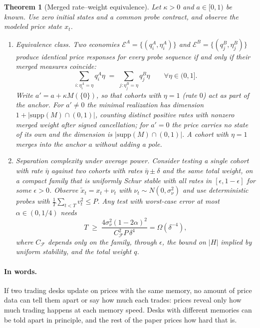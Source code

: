 \documentclass[12pt]{article}
\newtheorem{theorem}{Theorem}[section]
\theoremstyle{definition}
\theoremstyle{remark}
\begin{document}
\begin{theorem}[Merged rate--weight equivalence]\label{thm:merged}
Let $\kappa>0$ and $a\in[0,1)$ be known. Use zero initial states and a common probe contract, and observe the modeled price state $x_t$.
\begin{enumerate}[label=(\roman*)]
\item \emph{Equivalence class.} Two economies $\mathcal E^A=\{(q_i^A,\eta_i^A)\}$ and $\mathcal E^B=\{(q_j^B,\eta_j^B)\}$ produce identical price responses for every probe sequence if and only if their merged measures coincide:
\begin{equation}\label{eq:merged}
\sum_{i:\eta_i^A=\eta} q_i^A\eta \;=\; \sum_{j:\eta_j^B=\eta} q_j^B\eta\qquad\forall\eta\in(0,1].
\end{equation}
Write $a'=a+\kappa M(\{0\})$, so that cohorts with $\eta=1$ (rate $0$) act as part of the anchor. For $a'\neq0$ the minimal realization has dimension $1+|\mathrm{supp}(M)\cap(0,1)|$, counting distinct positive rates with nonzero merged weight after signed cancellation; for $a'=0$ the price carries no state of its own and the dimension is $|\mathrm{supp}(M)\cap(0,1)|$. A cohort with $\eta=1$ merges into the anchor $a$ without adding a pole.
\item \emph{Separation complexity under average power.} Consider testing a single cohort with rate $\bar\eta$ against two cohorts with rates $\bar\eta\pm\delta$ and the same total weight, on a compact family that is uniformly Schur stable with all rates in $[\epsilon,1-\epsilon]$ for some $\epsilon>0$. Observe $\tilde x_t=x_t+\nu_t$ with $\nu_t\sim N(0,\sigma_\nu^2)$ and use deterministic probes with $\frac1T\sum_{t<T}v_t^2\le P$. Any test with worst-case error at most $\alpha\in(0,1/4)$ needs
\begin{equation}\label{eq:Tpower}
T\;\ge\;\frac{4\sigma_\nu^2(1-2\alpha)^2}{C_{\mathcal F}^2P\,\delta^4}=\Omega(\delta^{-4}),
\end{equation}
where $C_{\mathcal F}$ depends only on the family, through $\epsilon$, the bound on $|H|$ implied by uniform stability, and the total weight $q$.
\end{enumerate}
\end{theorem}

\paragraph{In words.} If two trading desks update on prices with the same memory, no amount of price data can tell them apart or say how much each trades: prices reveal only how much trading happens at each memory speed. Desks with different memories can be told apart in principle, and the rest of the paper prices how hard that is.
\end{document}
